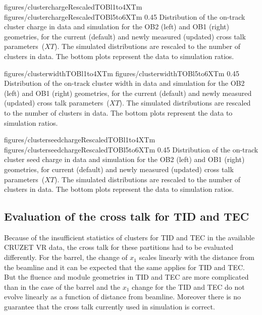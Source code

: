                  {figures/clusterchargeRescaledTOBl1to4XTm} %
                 {figures/clusterchargeRescaledTOBl5to6XTm} %
                 {0.45}       %
                 { Distribution of the on-track cluster charge in data and simulation for the OB2 (left) and OB1 (right) geometries, for the current (default) and newly measured (updated) cross talk parameters~($XT$).  The simulated distributions are rescaled to the number of clusters in data.  The bottom plots represent the data to simulation ratios. }

                 {figures/clusterwidthTOBl1to4XTm}
                 {figures/clusterwidthTOBl5to6XTm}
                 {0.45}       %
                 { Distribution of the on-track cluster width in data and simulation for the OB2 (left) and OB1 (right) geometries, for the current (default) and newly measured (updated) cross talk parameters~($XT$).  The simulated distributions are rescaled to the number of clusters in data.  The bottom plots represent the data to simulation ratios. }

                 {figures/clusterseedchargeRescaledTOBl1to4XTm} %
                 {figures/clusterseedchargeRescaledTOBl5to6XTm} %
                 {0.45}       %
                 { Distribution of the on-track cluster seed charge in data and simulation for the OB2 (left) and OB1 (right) geometries, for current (default) and newly measured (updated) cross talk parameters~($XT$).  The simulated distributions are rescaled to the number of clusters in data.  The bottom plots represent the data to simulation ratios. }


\subsection{Evaluation of the cross talk for TID and TEC~\label{sec:tuning}}



Because of the insufficient statistics of clusters for TID and TEC in the available CRUZET VR data, the cross talk for these partitions had to be evaluated differently. For the barrel, the change of $x_{1}$ scales linearly with the distance from the beamline and it can be expected that the same applies for TID and TEC. But the fluence and module geometries in TID and TEC are more complicated than in the case of the barrel and the $x_{1}$ change for the TID and TEC do not evolve linearly as a function of distance from beamline. Moreover there is no guarantee that the cross talk currently used in simulation is correct.  

